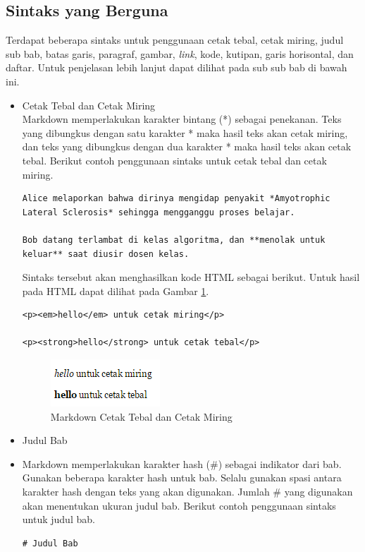 \begin{itemize}
\begin{itemize}
\subsection{Sintaks yang Berguna \cite{Markguide:2015}}
Terdapat beberapa sintaks untuk penggunaan cetak tebal, cetak miring, judul sub
bab, batas garis, paragraf, gambar, {\it link}, kode, kutipan, garis
horisontal, dan daftar. Untuk penjelasan lebih lanjut dapat dilihat pada sub sub
bab di bawah ini.

\begin{itemize}
\item Cetak Tebal dan Cetak Miring\\
Markdown memperlakukan karakter bintang (*) sebagai penekanan. Teks yang
dibungkus dengan satu karakter * maka hasil teks akan cetak miring, dan teks
yang dibungkus dengan dua karakter * maka hasil teks akan cetak tebal. Berikut
contoh penggunaan sintaks untuk cetak tebal dan cetak miring.

\begin{lstlisting}[basicstyle=\footnotesize]
Alice melaporkan bahwa dirinya mengidap penyakit *Amyotrophic Lateral Sclerosis* sehingga mengganggu proses belajar.

Bob datang terlambat di kelas algoritma, dan **menolak untuk keluar** saat diusir dosen kelas.
\end{lstlisting}

Sintaks tersebut akan menghasilkan kode HTML sebagai berikut. Untuk hasil pada
HTML dapat dilihat pada Gambar \ref{fig:cmct}.

\begin{lstlisting}[basicstyle=\footnotesize]
<p><em>hello</em> untuk cetak miring</p>

<p><strong>hello</strong> untuk cetak tebal</p>
\end{lstlisting}

\begin{figure}[H]
\centering
\includegraphics[scale=1]{Gambar/cmct.png}
\caption[Markdown Cetak Tebal dan Cetak Miring]{Markdown Cetak Tebal dan
Cetak Miring}
\label{fig:cmct}
\end{figure}

\item Judul Bab\\
\item Markdown memperlakukan karakter hash (\#) sebagai indikator dari bab. Gunakan
beberapa karakter hash untuk bab. Selalu gunakan spasi antara karakter hash
dengan teks yang akan digunakan. Jumlah \# yang digunakan akan menentukan ukuran
judul bab. Berikut contoh penggunaan sintaks untuk judul bab.
\begin{lstlisting}[basicstyle=\footnotesize]
# Judul Bab


\end{lstlisting}
\end{itemize}
\end{itemize}
\end{itemize}
